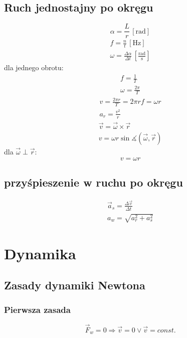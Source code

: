 \documentclass{article}
\numberwithin{equation}{section}
\newcommand{\unit}[1]{\, \left[\mathrm{#1}\right]}
\begin{document}
    \subsection{Ruch jednostajny po okręgu}
      \begin{equation}
        \alpha = \frac Lr \unit{rad}
      \end{equation}
      \begin{gather}
        f = \frac nt \unit{Hz}\\
        \omega = \frac{\Delta\alpha}{\Delta t} \unit{\frac{rad}{s}}
      \end{gather}
      dla jednego obrotu:
      \begin{gather}
        f = \frac 1T\\
        \omega = \frac{2\pi}{T}
      \end{gather}
      \begin{gather}
        v = \frac{2\pi r}{T} = 2\pi rf = \omega r\\
        a_r = \frac{v^2}{r}
      \end{gather}
      \begin{gather}
        \vec v = \vec\omega \times \vec r\\
        v = \omega r\sin\measuredangle(\vec\omega, \vec r)
      \end{gather}
      dla $\vec\omega \perp \vec r$:
      \begin{equation}
        v = \omega r
      \end{equation}
    \subsection{przyśpieszenie w ruchu po okręgu}
      \begin{gather}
        \vec a_s = \frac{\Delta\vec v}{\Delta t}\\
        a_w = \sqrt{a_r^2 + a_s^2}
      \end{gather}

  \newpage
  \section{Dynamika}
    \subsection{Zasady dynamiki Newtona}
      \subsubsection{Pierwsza zasada}
        \begin{equation}
          \vec F_w = 0 \Rightarrow \vec v = 0 \lor \vec v = const.
        \end{equation}
\end{document}
